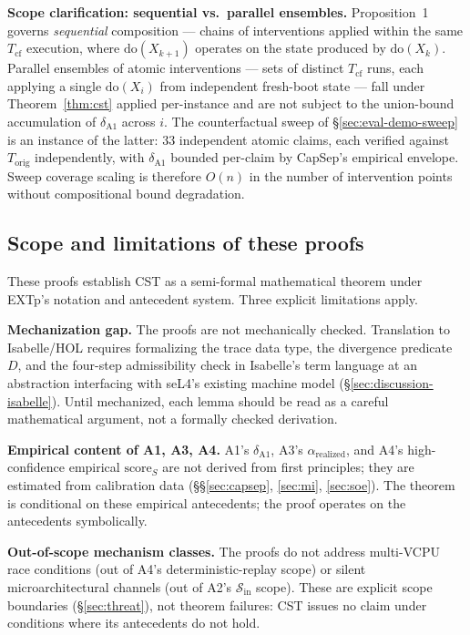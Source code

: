 \documentclass[conference]{IEEEtran}
\newcommand{\Korig}{T_\text{orig}}
\newcommand{\Tcf}{T_\text{cf}}
\newcommand{\arealized}{\alpha_\text{realized}}
\newcommand{\scoreS}{\text{score}_S}
\begin{document}
\textbf{Scope clarification: sequential vs.\ parallel ensembles.}
Proposition~1 governs \emph{sequential} composition --- chains of
interventions applied within the same $\Tcf$ execution, where
$\text{do}(X_{k+1})$ operates on the state produced by
$\text{do}(X_k)$. Parallel ensembles of atomic interventions ---
sets of distinct $\Tcf$ runs, each applying a single
$\text{do}(X_i)$ from independent fresh-boot state --- fall under
Theorem~\ref{thm:cst} applied per-instance and are not subject to
the union-bound accumulation of $\delta_{\text{A1}}$ across $i$.
The counterfactual sweep of \S\ref{sec:eval-demo-sweep} is an
instance of the latter: 33 independent atomic claims, each
verified against $\Korig$ independently, with $\delta_{\text{A1}}$
bounded per-claim by CapSep's empirical envelope. Sweep coverage
scaling is therefore $O(n)$ in the number of intervention points
without compositional bound degradation.

\subsection{Scope and limitations of these proofs}

These proofs establish CST as a semi-formal mathematical
theorem under EXTp's notation and antecedent system. Three
explicit limitations apply.

\textbf{Mechanization gap.} The proofs are not mechanically
checked. Translation to Isabelle/HOL requires formalizing the
trace data type, the divergence predicate $D$, and the
four-step admissibility check in Isabelle's term language at
an abstraction interfacing with seL4's existing machine model
(\S\ref{sec:discussion-isabelle}). Until mechanized, each lemma
should be read as a careful mathematical argument, not a
formally checked derivation.

\textbf{Empirical content of A1, A3, A4.} A1's
$\delta_{\text{A1}}$, A3's $\arealized$, and A4's
high-confidence empirical $\scoreS$ are not derived from first
principles; they are estimated from calibration data
(\S\S\ref{sec:capsep}, \ref{sec:mi}, \ref{sec:soe}). The theorem
is conditional on these empirical antecedents; the proof
operates on the antecedents symbolically.

\textbf{Out-of-scope mechanism classes.} The proofs do not address
multi-VCPU race conditions (out of A4's deterministic-replay
scope) or silent microarchitectural channels (out of A2's
$\mathcal{S}_\text{in}$ scope). These are explicit scope
boundaries (\S\ref{sec:threat}), not theorem failures: CST
issues no claim under conditions where its antecedents do not
hold.
\end{document}
